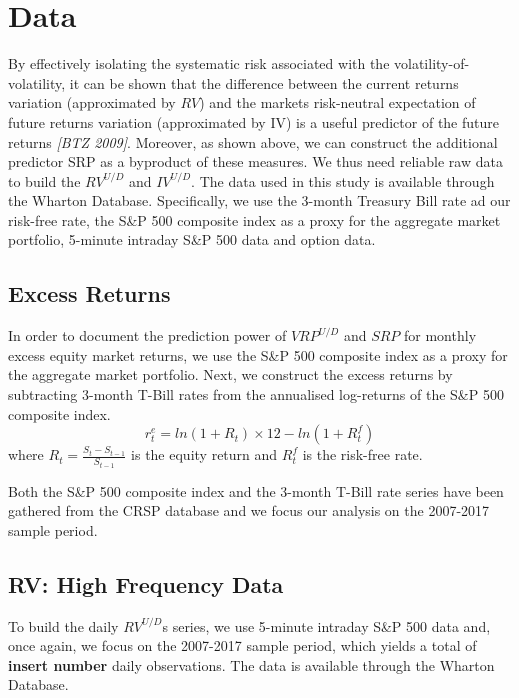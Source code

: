 
\section{Data}\label{sec:chapter3}

By effectively isolating the systematic risk associated with the volatility-of-volatility, it can be shown that the difference between the current returns variation (approximated by $RV$) and the markets risk-neutral expectation of future returns variation (approximated by IV) is a useful predictor of the future returns \textit{[BTZ 2009]}. Moreover, as shown above, we can construct the additional predictor SRP as a byproduct of these measures. We thus need reliable raw data to build the $RV^{U/D}$ and $IV^{U/D}$. The data used in this study is available through the Wharton Database. Specifically, we use the 3-month Treasury Bill rate ad our risk-free rate, the S\&P 500 composite index as a proxy for the aggregate market portfolio, 5-minute intraday S\&P 500 data and option data.

\subsection{Excess Returns}
In order to document the prediction power of $VRP^{U/D}$ and $SRP$ for monthly excess equity market returns, we use the S\&P 500 composite index as a proxy for the aggregate market portfolio. Next, we construct the excess returns by subtracting 3-month T-Bill rates from the annualised log-returns of the S\&P 500 composite index. 
\begin{equation}
r^e_t=ln(1+R_t) \times 12 - ln(1+R_t^f)
\end{equation}
where $R_t= \frac{S_t-S_{t-1}}{S_{t-1}}$ is the equity return and $R_t^f$ is the risk-free rate. 

\vspace{4mm}
Both the S\&P 500 composite index and the 3-month T-Bill rate series have been gathered from the CRSP database and we focus our analysis on the 2007-2017 sample period. 

\subsection{RV: High Frequency Data}
To build the daily $RV^{U/D}$s series, we use 5-minute intraday S\&P 500 data and, once again, we focus on the 2007-2017 sample period, which yields a total of \textbf{insert number} daily observations. The data is available through the Wharton Database.

